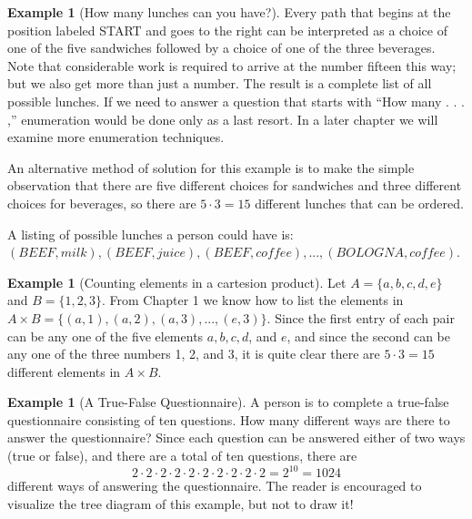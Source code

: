 \documentclass[10pt,]{book}
\theoremstyle{plain}
\theoremstyle{definition}
\theoremstyle{definition}
\newtheorem{example}[theorem]{Example}
\theoremstyle{definition}
\begin{document}
\begin{example}[How many lunches can you have?]
 Every path that begins at the position labeled START and goes to the right can be interpreted as a choice of one of the five sandwiches followed by a choice of one of the three beverages. Note that considerable work is required to arrive at the number fifteen this way; but we also get more than just a number. The result is a complete list of all possible lunches. If we need to answer a question that starts with ``How many . . . ,'' enumeration would be done only as a last resort. In a later chapter we will examine more enumeration techniques.
%
\par

 An alternative method of solution for this example is to make the simple observation that there are five different choices for sandwiches and three different choices for beverages, so there are \(5 \cdot 3 = 15\) different lunches that can be ordered.
%
\par

 A listing of possible lunches a person could have is: \({(BEEF, milk), (BEEF, juice), (BEEF, coffee), ..., (BOLOGNA, coffee)}\).
%
\end{example}
\begin{example}[Counting elements in a cartesion product]\label{cartesian-cardinality}
Let \(A = \{a, b, c, d, e\}\) and \(B = \{1,2,3\}\). From Chapter 1 we know how to list the elements in \(A \times B = \{(a, 1), (a, 2), (a, 3), ..., (e, 3)\}\).  Since the first entry of each pair can be any one of the five elements \(a, b, c, d\), and \(e\), and since the second can be any one of the three numbers 1, 2, and 3, it is quite clear there are 
\(5 \cdot 3 = 15\) different elements in \(A \times B\).
%
\end{example}
\begin{example}[A True-False Questionnaire]\label{questionnaire}
A person is to complete a true-false questionnaire consisting of ten questions. How many different ways are there to answer the questionnaire? Since each question can be answered either of two ways (true or false), and there are a total of ten questions, there are \begin{equation*} 2 \cdot 2 \cdot 2 \cdot 2 \cdot 2 \cdot 2 \cdot 2 \cdot 2 \cdot 2 \cdot 2 = 2^{10} = 1024\end{equation*} different ways of answering the questionnaire. The reader is encouraged to visualize the tree diagram of this example, but not to draw it!%
\end{example}
\par
\end{document}
